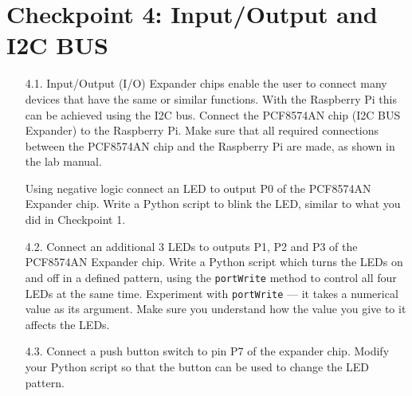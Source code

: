 \newpage
\section{Checkpoint 4: Input/Output and I2C BUS}

\begin{enumerate}


\item [4.1.] Input/Output (I/O) Expander chips enable the user to connect many devices that have the same or similar functions.
With the Raspberry Pi this can be achieved using the I2C bus.
Connect the PCF8574AN chip  (I2C BUS Expander) to the Raspberry Pi.
Make sure that all required connections between the PCF8574AN chip and the Raspberry Pi are made, as shown in the lab manual.

Using negative logic connect an LED to output P0 of the PCF8574AN Expander chip. 
Write a Python script to blink the LED, similar to what you did in Checkpoint 1.





\item [4.2.] Connect an additional 3 LEDs to outputs P1, P2 and P3 of the PCF8574AN Expander chip.
Write a Python script which turns the LEDs on and off in a defined pattern, using the \texttt{portWrite} method to control all four LEDs at the same time.
Experiment with \texttt{portWrite} --- it takes a numerical value as its argument.
Make sure you understand how the value you give to it affects the LEDs.


\item [4.3.] Connect a push button switch to pin P7 of the expander chip.
Modify your Python script so that the button can be used to change the LED pattern.



\end{enumerate}

